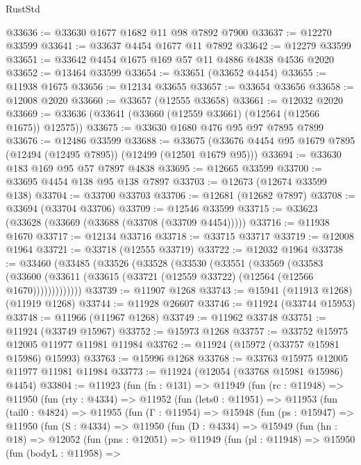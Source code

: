 \begin{lexlean}{RustStd}
\begin{coremodule}
@33636 := @33630 @1677 @1682 @11 @98 @7892 @7900
@33637 := @12270 @33599
@33641 := @33637 @4454 @1677 @11 @7892
@33642 := @12279 @33599
@33651 := @33642 @4454 @1675 @169 @57 @11 @4886 @4838 @4536 @2020
@33652 := @13464 @33599
@33654 := @33651 (@33652 @4454)
@33655 := @11938 @1675
@33656 := @12134 @33655
@33657 := @33654 @33656
@33658 := @12008 @2020
@33660 := @33657 (@12555 @33658)
@33661 := @12032 @2020
@33669 := @33636 (@33641 (@33660 (@12559 @33661) (@12564 (@12566 @1675)) @12575))
@33675 := @33630 @1680 @476 @95 @97 @7895 @7899
@33676 := @12486 @33599
@33688 := @33675 (@33676 @4454 @95 @1679 @7895 (@12494 (@12495 @7895)) (@12499 (@12501 @1679 @95)))
@33694 := @33630 @183 @169 @95 @57 @7897 @4838
@33695 := @12665 @33599
@33700 := @33695 @4454 @138 @95 @138 @7897
@33703 := @12673 (@12674 @33599 @138)
@33704 := @33700 @33703
@33706 := @12681 (@12682 @7897)
@33708 := @33694 (@33704 @33706)
@33709 := @12546 @33599
@33715 := @33623 (@33628 (@33669 (@33688 (@33708 (@33709 @4454)))))
@33716 := @11938 @1670
@33717 := @12134 @33716
@33718 := @33715 @33717
@33719 := @12008 @1964
@33721 := @33718 (@12555 @33719)
@33722 := @12032 @1964
@33738 := @33460
    (@33485
      (@33526
        (@33528
          (@33530
            (@33551
              (@33569
                (@33583
                  (@33600 (@33611 (@33615 (@33721 (@12559 @33722) (@12564 (@12566 @1670)))))))))))))
@33739 := @11907 @1268
@33743 := @15941 (@11913 @1268) (@11919 @1268)
@33744 := @11928 @26607
@33746 := @11924 (@33744 @15953)
@33748 := @11966 (@11967 @1268)
@33749 := @11962 @33748
@33751 := @11924 (@33749 @15967)
@33752 := @15973 @1268
@33757 := @33752 @15975 @12005 @11977 @11981 @11984
@33762 := @11924 (@15972 (@33757 @15981 @15986) @15993)
@33763 := @15996 @1268
@33768 := @33763 @15975 @12005 @11977 @11981 @11984
@33773 := @11924 (@12054 (@33768 @15981 @15986) @4454)
@33804 := @11923
    (fun (fn : @131) =>
    @11949
      (fun (rc : @11948) =>
      @11950
        (fun (rty : @4334) =>
        @11952
          (fun (lets0 : @11951) =>
          @11953
            (fun (tail0 : @4824) =>
            @11955
              (fun (Γ : @11954) =>
              @15948
                (fun (ps : @15947) =>
                @11950
                  (fun (S : @4334) =>
                  @11950
                    (fun (D : @4334) =>
                    @15949
                      (fun (hn : @18) =>
                      @12052
                        (fun (pns : @12051) =>
                        @11949
                          (fun (pl : @11948) =>
                          @15950
                            (fun (bodyL : @11958) =>

\end{coremodule}
\end{lexlean}
